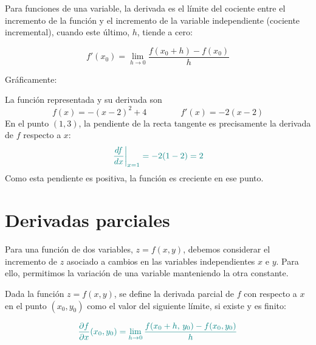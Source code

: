 \documentclass{article}
\begin{document}
Para funciones de una variable, la derivada es el límite del cociente entre el incremento de la función y el incremento de la variable independiente (cociente incremental), cuando este último, \(h\), tiende a cero:

\[
f'(x_{0}) = \lim_{h\to0}\frac{f(x_{0}+h)-f(x_{0})}{h}
\]

Gráficamente:

\begin{center}
\end{center}
La función representada y su derivada son
\[
f(x)=-(x-2)^{2}+4
\qquad\qquad
f'(x)=-2(x-2)
\]
En el punto \((1,3)\), la pendiente de la recta tangente es precisamente la derivada de \(f\) respecto a \(x\):
\[
\color{teal}
\left.\frac{df}{dx}\right|_{x=1}=-2(1-2)=2
\]
Como esta pendiente es positiva, la función es creciente en ese punto.





\section*{Derivadas parciales}

Para una función de dos variables, \(z=f(x,y)\), debemos considerar el incremento de \(z\) asociado a cambios en las variables independientes \(x\) e \(y\). Para ello, permitimos la variación de una variable manteniendo la otra constante.


Dada la función \(z = f(x,y)\), se define la derivada parcial de \(f\) con respecto a \(x\) en el punto \((x_{0},y_{0})\) como el valor del siguiente límite, si existe y es finito:

\[ \color{teal}
\frac{\partial f}{\partial x}(x_{0},y_{0})
=
\lim_{h\to0}
\frac{f(x_{0}+h,\,y_{0}) - f(x_{0},y_{0})}{h}
\]
\end{document}
